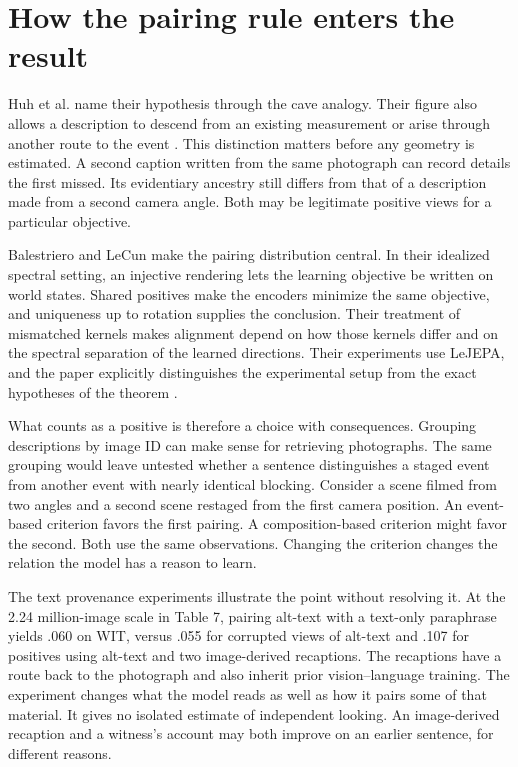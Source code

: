 \documentclass[11pt]{article}
\begin{document}
\section{How the pairing rule enters the result}
Huh et al. name their hypothesis through the cave analogy. Their figure also allows a description to descend from an existing measurement or arise through another route to the event \cite{huh2024platonic}. This distinction matters before any geometry is estimated. A second caption written from the same photograph can record details the first missed. Its evidentiary ancestry still differs from that of a description made from a second camera angle. Both may be legitimate positive views for a particular objective.

Balestriero and LeCun make the pairing distribution central. In their idealized spectral setting, an injective rendering lets the learning objective be written on world states. Shared positives make the encoders minimize the same objective, and uniqueness up to rotation supplies the conclusion. Their treatment of mismatched kernels makes alignment depend on how those kernels differ and on the spectral separation of the learned directions. Their experiments use LeJEPA, and the paper explicitly distinguishes the experimental setup from the exact hypotheses of the theorem \cite{balestriero2026platonic}.

What counts as a positive is therefore a choice with consequences. Grouping descriptions by image ID can make sense for retrieving photographs. The same grouping would leave untested whether a sentence distinguishes a staged event from another event with nearly identical blocking. Consider a scene filmed from two angles and a second scene restaged from the first camera position. An event-based criterion favors the first pairing. A composition-based criterion might favor the second. Both use the same observations. Changing the criterion changes the relation the model has a reason to learn.

The text provenance experiments illustrate the point without resolving it. At the 2.24 million-image scale in Table 7, pairing alt-text with a text-only paraphrase yields .060 on WIT, versus .055 for corrupted views of alt-text and .107 for positives using alt-text and two image-derived recaptions. The recaptions have a route back to the photograph and also inherit prior vision–language training. The experiment changes what the model reads as well as how it pairs some of that material. It gives no isolated estimate of independent looking. An image-derived recaption and a witness's account may both improve on an earlier sentence, for different reasons.
\end{document}
